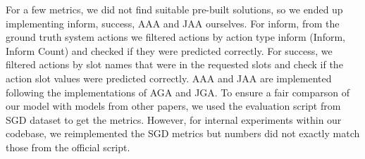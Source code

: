 For a few metrics, we did not find suitable pre-built solutions, so we ended up implementing inform, success, AAA and JAA ourselves.
For inform, from the ground truth system actions we filtered actions by action type inform (Inform, Inform Count)
and checked if they were predicted correctly. For success, we filtered actions by slot names that were in the requested slots and
check if the action slot values were predicted correctly. AAA and JAA are implemented following the implementations of AGA and JGA.
To ensure a fair comparson of our model with models from other papers, we used the evaluation script from SGD dataset to get the metrics.
However, for internal experiments within our codebase, we reimplemented the SGD metrics but numbers did not exactly match those from the official script.




